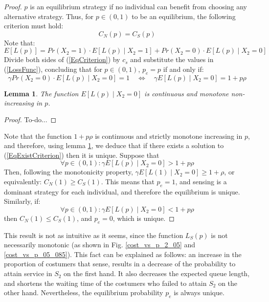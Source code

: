 \documentclass[11pt]{article}
\numberwithin{equation}{section}
\newtheorem{lemma}{Lemma}[proposition]
\begin{document}
\begin{proof}

$p$ is an equilibrium strategy if no individual can benefit from choosing any alternative strategy. Thus, for $p \in (0,1)$ to be an equilibrium, the following criterion must hold: 
\begin{equation}
C_{N}(p)=C_{S}(p) \label{EqCriterion}
\end{equation}
Note that:
\[ E\left[L(p)\right] = Pr(X_2=1) \cdot E\left[L(p)\mid X_2=1\right] + Pr(X_2=0) \cdot E\left[L(p)\mid X_2=0\right] \]
Divide both sides of (\ref{EqCriterion}) by $c_{s}$ and substitute the values in (\ref{LossFunc}), concluding that for $p \in (0,1)$, $p_{e} = p$ if and only if:
\begin{equation}
\gamma Pr(X_2=0) \cdot E\left[L(p)\mid X_2=0\right] = 1 \quad\Leftrightarrow\quad \gamma E\left[L(p)\mid X_2=0\right]=1+p\rho \label{EqExistCriterion}
\end{equation}

\begin{lemma}
The function $E\left[L(p)\mid X_2=0\right]$ is continuous and monotone non-increasing in $p$. \label{MonotonicityLemma}
\end{lemma}

\begin{proof}
To-do...
\end{proof}

Note that the function $1+p\rho$ is continuous and strictly monotone increasing in $p$, and therefore, using lemma \ref{MonotonicityLemma}, we deduce that if there exists a solution to (\ref{EqExistCriterion}) then it is unique. 
Suppose that
\[ \forall p \in (0,1): \gamma E\left[L(p)\mid X_2=0\right] > 1+p\rho \] 
Then, following the monotonicity property, $\gamma E\left[L(1)\mid X_2=0\right] \geq 1+\rho$, or equivalently: $C_{N}(1) \geq C_{S}(1)$. This means that $p_{e}=1$, and sensing is a dominant strategy for each individual, and therefore the equilibrium is unique. Similarly, if: 
\[ \forall p \in (0,1): \gamma E\left[L(p)\mid X_2=0\right] < 1+p\rho \] 
then $C_{N}(1) \leq C_{S}(1)$, and $p_{e}=0$, which is unique.
\end{proof}

This result is not as intuitive as it seems, since the function $L_{S}(p)$ is not necessarily monotonic (as shown in Fig. \ref{cost_vs_p_2_05} and \ref{cost_vs_p_05_085}). This fact can be explained as follows: an increase in the proportion of costumers that sense, results in a decrease of the probability to attain service in $S_{2}$ on the first hand. It also decreases the expected queue length, and shortens the waiting time of the costumers who failed to attain $S_{2}$ on the other hand. Nevertheless, the equilibrium probability $p_{e}$ is always unique.
\end{document}
